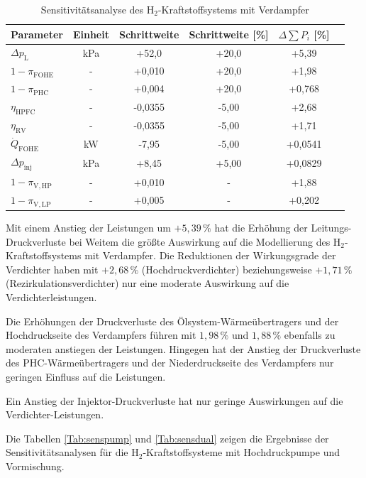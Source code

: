 \begin{table}[ht]
	\centering
	\caption{Sensitivitätsanalyse des H$_2$-Kraftstoffsystems mit Verdampfer}
	\begin{tabular} {|l|c|c|c|c|c|} \hline%
		Parameter & Einheit & Schrittweite & Schrittweite [\%] & $ \Delta \sum P_i$ [\%] \\ \hline\hline%
		$\Delta p_\mathrm{L}$ & \si{\kilo\Pa} & +52,0 & +20,0 & +5,39 \\ \hline 
		$1-\pi_\mathrm{FOHE}$ & - & +0,010 & +20,0 & +1,98 \\ \hline 
		$1-\pi_\mathrm{PHC}$ & - & +0,004 & +20,0 & +0,768 \\ \hline
		$\eta_\mathrm{HPFC}$ & - & -0,0355 & -5,00 & +2,68 \\ \hline  
		$\eta_\mathrm{RV}$ & - & -0,0355 & -5,00 & +1,71 \\ \hline 
		$\dot{Q}_\mathrm{FOHE}$ & \si{\kilo\W} & -7,95 & -5,00 & +0,0541 \\ \hline 
		$\Delta p_\mathrm{inj}$ & \si{\kilo\Pa} & +8,45 & +5,00 & +0,0829 \\ \hline 
		$1-\pi_\mathrm{V, HP}$ & - & +0,010 & - & +1,88 \\ \hline 
		$1-\pi_\mathrm{V, LP}$ & - & +0,005 & - & +0,202 \\ \hline 
	\end{tabular}	
	\label{Tab:sensafter}%
\end{table}
\FloatBarrier 

Mit einem Anstieg der Leistungen um  $+5,39\,\%$ hat die Erhöhung der Leitungs-Druckverluste bei Weitem die größte Auswirkung auf die Modellierung des H$_2$-Kraftstoffsystems mit Verdampfer. Die Reduktionen der Wirkungsgrade der Verdichter haben mit $+2,68\,\%$ (Hochdruckverdichter) beziehungsweise $+1,71\,\%$ (Rezirkulationsverdichter) nur eine moderate Auswirkung auf die Verdichterleistungen. 

Die Erhöhungen der Druckverluste des Ölsystem-Wärmeübertragers und der Hochdruckseite des Verdampfers führen mit $1,98\,\%$ und $1,88\,\%$ ebenfalls zu moderaten anstiegen der Leistungen. Hingegen hat der Anstieg der Druckverluste des PHC-Wärmeübertragers und der Niederdruckseite des Verdampfers nur geringen Einfluss auf die Leistungen. 

Ein Anstieg der Injektor-Druckverluste hat nur geringe Auswirkungen auf die Verdichter-Leistungen.


Die Tabellen \ref{Tab:senspump} und \ref{Tab:sensdual} zeigen die Ergebnisse der Sensitivitätsanalysen für die H$_2$-Kraftstoffsysteme mit Hochdruckpumpe und Vormischung.

